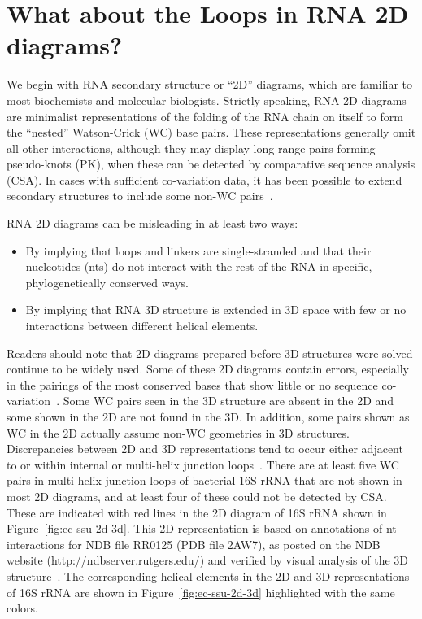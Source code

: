 \section{What about the Loops in RNA 2D diagrams?}

We begin with RNA secondary structure or ``2D'' diagrams, which are familiar to
most biochemists and molecular biologists. Strictly speaking, RNA 2D diagrams
are minimalist representations of the folding of the RNA chain on itself to form
the ``nested'' Watson-Crick (WC) base pairs. These representations generally omit
all other interactions, although they may display long-range pairs forming
pseudo-knots (PK), when these can be detected by comparative sequence analysis
(CSA). In cases with sufficient co-variation data, it has been possible to
extend secondary structures to include some non-WC pairs~\cite{Gutell1994}. 

RNA 2D diagrams can be misleading in at least two ways: 
\begin{itemize}
  \item By implying that loops and linkers are single-stranded and that their
    nucleotides (nts) do not interact with the rest of the RNA in specific,
    phylogenetically conserved ways.

  \item By implying that RNA 3D structure is extended in 3D space with few or no
    interactions between different helical elements. 
\end{itemize}

Readers should note that 2D diagrams prepared before 3D structures were solved
continue to be widely used. Some of these 2D diagrams contain errors, especially
in the pairings of the most conserved bases that show little or no sequence
co-variation~\cite{Petrov2013a}. Some WC pairs seen in the 3D structure are
absent in the 2D and some shown in the 2D are not found in the 3D\@. In addition,
some pairs shown as WC in the 2D actually assume non-WC geometries in 3D
structures. Discrepancies between 2D and 3D representations tend to occur either
adjacent to or within internal or multi-helix junction loops~\cite{Petrov2013}.
There are at least five WC pairs in multi-helix junction loops of bacterial 16S
rRNA that are not shown in most 2D diagrams, and at least four of these could
not be detected by CSA\@. These are indicated with red lines in the 2D diagram
of \EC{} 16S rRNA shown in Figure~\ref{fig:ec-ssu-2d-3d}. This 2D representation
is based on annotations of nt interactions for NDB file RR0125 (PDB file 2AW7),
as posted on the NDB website (http://ndbserver.rutgers.edu/) and verified by
visual analysis of the 3D structure~\cite{CoimbatoreNarayanan2014}. The
corresponding helical elements in the 2D and 3D representations of 16S rRNA are
shown in Figure~\ref{fig:ec-ssu-2d-3d} highlighted with the same colors. 

